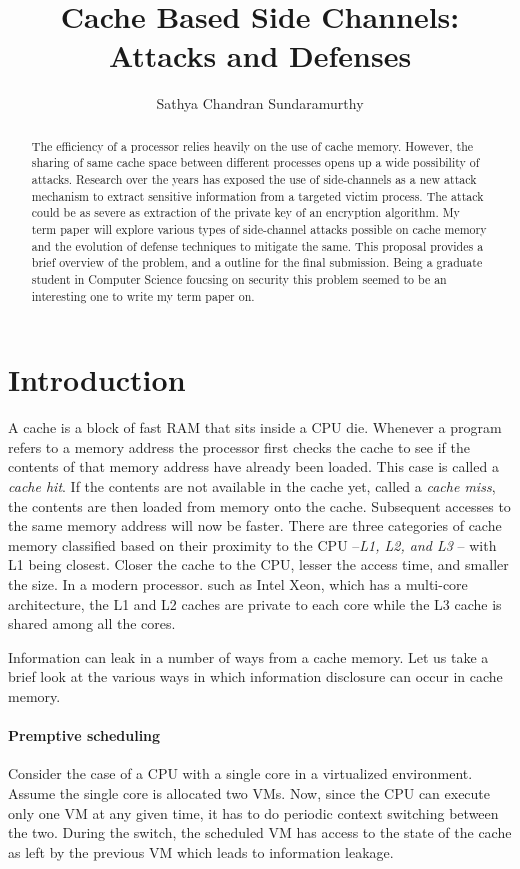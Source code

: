 \documentclass[onecolumn]{IEEEtran}
\title{Cache Based Side Channels: Attacks and Defenses}
\author{Sathya Chandran Sundaramurthy}
\begin{document}
\maketitle
\begin{abstract}
The efficiency of a processor relies heavily on the use of cache
memory.  However, the sharing of same cache space between different
processes opens up a wide possibility of attacks.  Research over the
years has exposed the use of side-channels as a new attack mechanism
to extract sensitive information from a targeted victim process. The
attack could be as severe as extraction of the private key of an
encryption algorithm.  My term paper will explore various types of
side-channel attacks possible on cache memory and the evolution of
defense techniques to mitigate the same.  This proposal provides a
brief overview of the problem, and a outline for the final submission.
Being a graduate student in Computer Science foucsing on security this
problem seemed to be an interesting one to write my term paper on.
\end{abstract}
\section{Introduction}

A cache is a block of fast RAM that sits inside a CPU die.  Whenever a
program refers to a memory address the processor first checks the
cache to see if the contents of that memory address have already been
loaded.  This case is called a {\it cache hit}.  If the contents are
not available in the cache yet, called a {\it cache miss}, the
contents are then loaded from memory onto the cache.  Subsequent
accesses to the same memory address will now be faster. There are
three categories of cache memory classified based on their proximity
to the CPU --{\it L1, L2, and L3} -- with L1 being closest.  Closer
the cache to the CPU, lesser the access time, and smaller the size.
In a modern processor. such as Intel Xeon, which has a
multi-core architecture, the L1 and L2 caches are private to each core
while the L3 cache is shared among all the cores.

Information can leak in a number of ways from a cache memory.  Let us take
a brief look at the various ways in which information disclosure can occur
in cache memory.

\paragraph{Premptive scheduling} Consider the case of a CPU with a
single core in a virtualized environment.  Assume the single core is
allocated two VMs.  Now, since the CPU can execute only one VM at any
given time, it has to do periodic context switching between the two.
During the switch, the scheduled VM has access to the state of the
cache as left by the previous VM which leads to information leakage.
\end{document}
